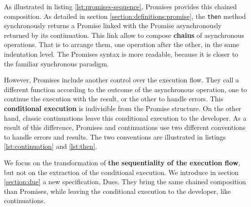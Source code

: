As illustrated in listing \ref{lst:promises-sequence}, Promises provides this chained composition.
As detailed in section \ref{section:definitions:promise}, the \texttt{then} method synchronously returns a Promise linked with the Promise asynchronously returned by its continuation.
This link allow to compose \textbf{chains} of asynchronous operations.
That is to arrange them, one operation after the other, in the same indentation level.
The Promises syntax is more readable, because it is closer to the familiar synchronous paradigm.

However, Promises include another control over the execution flow.
They call a different function according to the outcome of the asynchronous operation, one to continue the execution with the result, or the other to handle errors.
This \textbf{conditional execution} is indivisible from the Promise structure.
On the other hand, classic continuations leave this conditional execution to the developer.
As a result of this difference, Promises and continuations use two different conventions to handle errors and results.
The two conventions are illustrated in listings \ref{lst:continuation} and \ref{lst:then}.

We focus on the transformation of \textbf{the sequentiality of the execution flow}, but not on the extraction of the conditional execution.
We introduce in section \ref{section:due} a new specification, Dues.
They bring the same chained composition than Promises, while leaving the conditional execution to the developer, like continuations.










